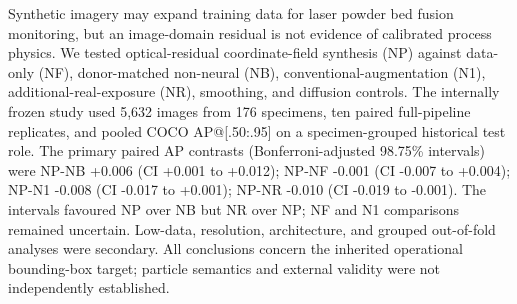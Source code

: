 Synthetic imagery may expand training data for laser powder bed fusion monitoring, but an image-domain residual is not evidence of calibrated process physics. We tested optical-residual coordinate-field synthesis (NP) against data-only (NF), donor-matched non-neural (NB), conventional-augmentation (N1), additional-real-exposure (NR), smoothing, and diffusion controls. The internally frozen study used 5,632 images from 176 specimens, ten paired full-pipeline replicates, and pooled COCO AP@[.50:.95] on a specimen-grouped historical test role. The primary paired AP contrasts (Bonferroni-adjusted 98.75\% intervals) were NP-NB +0.006 (CI +0.001 to +0.012); NP-NF -0.001 (CI -0.007 to +0.004); NP-N1 -0.008 (CI -0.017 to +0.001); NP-NR -0.010 (CI -0.019 to -0.001). The intervals favoured NP over NB but NR over NP; NF and N1 comparisons remained uncertain. Low-data, resolution, architecture, and grouped out-of-fold analyses were secondary. All conclusions concern the inherited operational bounding-box target; particle semantics and external validity were not independently established.
